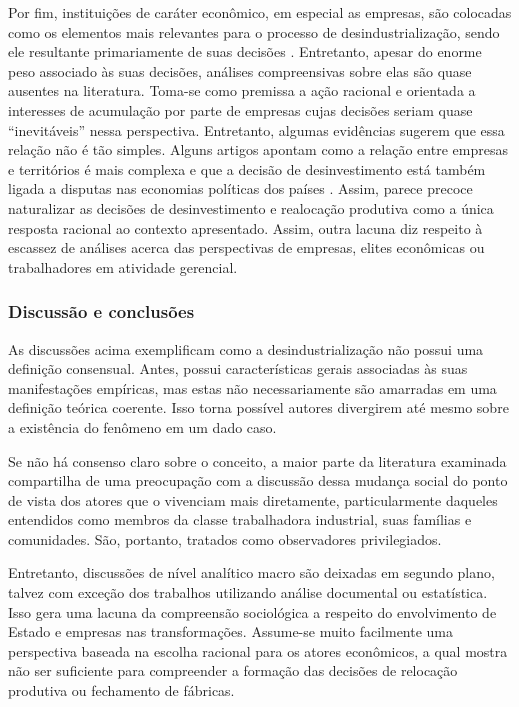 Por fim, instituições de caráter econômico, em especial as empresas, são
colocadas como os elementos mais relevantes para o processo de
desindustrialização, sendo ele resultante primariamente de suas decisões
\citep{clarke_closing_2015,kollmeyer_trade_2018}. Entretanto, apesar do enorme peso associado às suas
decisões, análises compreensivas sobre elas são quase ausentes na
literatura. Toma-se como premissa a ação racional e orientada a
interesses de acumulação por parte de empresas cujas decisões seriam
quase ``inevitáveis'' nessa perspectiva. Entretanto, algumas evidências
sugerem que essa relação não é tão simples. Alguns artigos apontam como
a relação entre empresas e territórios é mais complexa
\citep{highsmith_beyond_2014} e
que a decisão de desinvestimento está também ligada a disputas nas
economias políticas dos países
\citep{bluestone_deindustrialization_1982}. Assim, parece precoce naturalizar as decisões de desinvestimento
e realocação produtiva como a única resposta racional ao contexto
apresentado. Assim, outra lacuna diz respeito à escassez de análises
acerca das perspectivas de empresas, elites econômicas ou trabalhadores
em atividade gerencial.

\subsubsection{Discussão e conclusões}

As discussões acima exemplificam como a desindustrialização não possui
uma definição consensual. Antes, possui características gerais
associadas às suas manifestações empíricas, mas estas não
necessariamente são amarradas em uma definição teórica coerente. Isso
torna possível autores divergirem até mesmo sobre a existência do
fenômeno em um dado caso.

Se não há consenso claro sobre o conceito, a maior parte da literatura
examinada compartilha de uma preocupação com a discussão dessa mudança
social do ponto de vista dos atores que o vivenciam mais diretamente,
particularmente daqueles entendidos como membros da classe trabalhadora
industrial, suas famílias e comunidades. São, portanto, tratados como
observadores privilegiados.

Entretanto, discussões de nível analítico macro são deixadas em segundo
plano, talvez com exceção dos trabalhos utilizando análise documental ou
estatística. Isso gera uma lacuna da compreensão sociológica a respeito
do envolvimento de Estado e empresas nas transformações. Assume-se muito
facilmente uma perspectiva baseada na escolha racional para os atores
econômicos, a qual \citet{highsmith_beyond_2014} mostra não ser
suficiente para compreender a formação das decisões de relocação
produtiva ou fechamento de fábricas.

